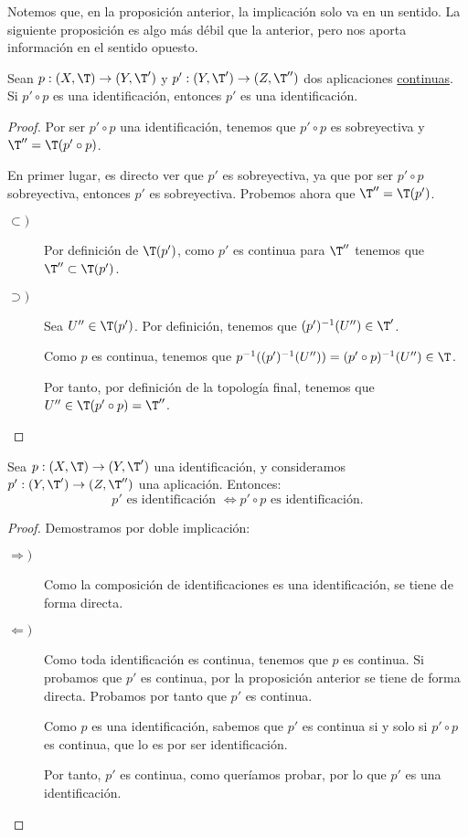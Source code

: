 Notemos que, en la proposición anterior, la implicación solo va en un sentido. La siguiente proposición es algo más débil que la anterior, pero nos aporta información en el sentido opuesto.
\begin{prop}
    Sean $p:(X,\T)\to (Y,\T')$ y $p':(Y,\T')\to (Z,\T'')$ dos aplicaciones \ul{continuas}. Si $p'\circ p$ es una identificación, entonces $p'$ es una identificación.
\end{prop}
\begin{proof}
    Por ser $p'\circ p$ una identificación, tenemos que $p'\circ p$ es sobreyectiva y $\T''=\T(p'\circ p)$.
    
    
    En primer lugar, es directo ver que $p'$ es sobreyectiva, ya que por ser $p'\circ p$ sobreyectiva, entonces $p'$ es sobreyectiva. Probemos ahora que $\T''=\T(p')$.
    \begin{description}
        \item[$\subset)$] Por definición de $\T(p')$, como $p'$ es continua para $\T''$ tenemos que $\T''\subset \T(p')$.

        \item[$\supset)$] Sea $U''\in \T(p')$. Por definición, tenemos que $(p')^{-1}(U'')\in \T'$.

        Como $p$ es continua, tenemos que $p^{-1}((p')^{-1}(U''))= (p'\circ p)^{-1}(U'')\in \T$.

        Por tanto, por definición de la topología final, tenemos que $U''\in \T(p'\circ p)=\T''$.
    \end{description}
\end{proof}


\begin{prop}
    Sea $p:(X,\T)\to (Y,\T')$ una identificación, y consideramos $p':(Y,\T')\to (Z,\T'')$ una aplicación. Entonces:
    \begin{equation*}
        p' \text{ es identificación }\Longleftrightarrow p'\circ p \text{ es identificación.}
    \end{equation*}
\end{prop}
\begin{proof} Demostramos por doble implicación:
\begin{description}
    \item[$\Longrightarrow)$] Como la composición de identificaciones es una identificación, se tiene de forma directa.

    \item[$\Longleftarrow)$] Como toda identificación es continua, tenemos que $p$ es continua. Si probamos que $p'$ es continua, por la proposición anterior se tiene de forma directa. Probamos por tanto que $p'$ es continua.

    Como $p$ es una identificación, sabemos que $p'$ es continua si y solo si $p'\circ p$ es continua, que lo es por ser identificación.

    Por tanto, $p'$ es continua, como queríamos probar, por lo que $p'$ es una identificación.
\end{description}
\end{proof}

